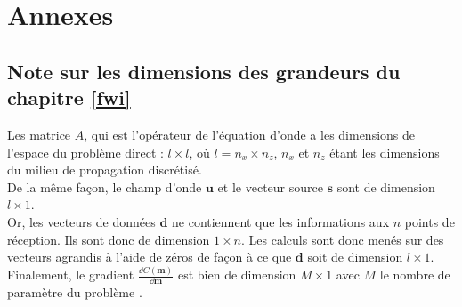\chapter{Annexes}

\section{Note sur les dimensions des grandeurs du chapitre \ref{fwi}}

Les matrice $A$, qui est l'opérateur de l'équation d'onde a les dimensions de l'espace du problème direct : $l\times l$, où $l=n_{x}\times n_{z}$, $n_{x}$ et $n_{z}$ étant les dimensions du milieu de propagation discrétisé.\\
 De la même façon, le champ d'onde $\bm{u}$ et le vecteur source $\bm{s}$ sont de dimension $l\times 1$.\\
Or, les vecteurs de données $\bm{d}$ ne contiennent que les informations aux $n$ points de réception. Ils sont donc de dimension $1\times n$. Les calculs sont donc menés sur des vecteurs agrandis à l'aide de zéros de façon à ce que $\bm{d}$ soit de dimension $l\times 1$. \\
Finalement, le gradient  $\frac{\dd C (\bm{m})}{\dd \bm{m}}$ est bien de dimension $M\times 1$ avec $M$ le nombre de paramètre du problème \citep{pratt_98}.
